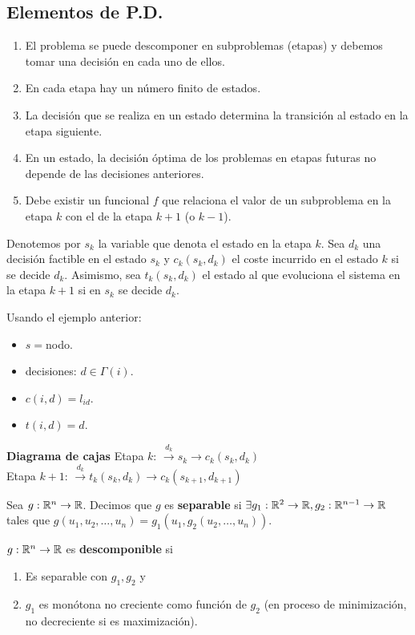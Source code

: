 \documentclass[MIOP.tex]{subfiles}
\begin{document}
\subsection{Elementos de P.D.}
\begin{enumerate}
\item El problema se puede descomponer en subproblemas (etapas) y debemos tomar una decisión en cada uno de ellos.
\item En cada etapa hay un número finito de estados.
\item La decisión que se realiza en un estado determina la transición al estado en la etapa siguiente.
\item En un estado, la decisión óptima de los problemas en etapas futuras no depende de las decisiones anteriores. 
\item Debe existir un funcional $f$ que relaciona el valor de un subproblema en la etapa $k$ con el de la etapa $k+1$ (o $k-1$). 
\end{enumerate}

Denotemos por $s_k$ la variable que denota el estado en la etapa $k$. Sea $d_k$ una decisión factible en el estado $s_k$ y $c_k(s_k,d_k)$ el coste incurrido en el estado $k$ si se decide $d_k$. Asimismo, sea $t_k(s_k,d_k)$ el estado al que evoluciona el sistema en la etapa $k+1$ si en $s_k$ se decide $d_k$.

Usando el ejemplo anterior:
\begin{itemize}
\item $s=$nodo.
\item decisiones: $d\in\Gamma(i)$.
\item $c(i,d)=l_{id}$.
\item $t(i,d)=d$.
\end{itemize}

\textbf{Diagrama de cajas}
Etapa $k$:
$\overset{d_k}{\longrightarrow}\boxed{s_k}\rightarrow c_k(s_k,d_k)$\\
Etapa $k+1$:
$\overset{d_k}{\longrightarrow}\boxed{t_k(s_k,d_k)}\rightarrow c_k(s_{k+1},d_{k+1})$

\begin{defi}
Sea $g:\mathbb{R}^n\to\mathbb{R}$. Decimos que $g$ es \textbf{separable} si $\exists g_1:\mathbb{R}^2\to\mathbb{R},g_2:\mathbb{R}^{n-1}\to\mathbb{R}$ tales que $g(u_1,u_2,\dots,u_n)=g_1(u_1,g_2(u_2,\dots,u_n))$. 
\end{defi}

\begin{defi}
$g:\mathbb{R}^n\to\mathbb{R}$ es \textbf{descomponible} si
\begin{enumerate}
\item Es separable con $g_1,g_2$ y
\item $g_1$ es monótona no creciente como función de $g_2$ (en proceso de minimización, no decreciente si es maximización). 
\end{enumerate}
\end{defi}
\end{document}
